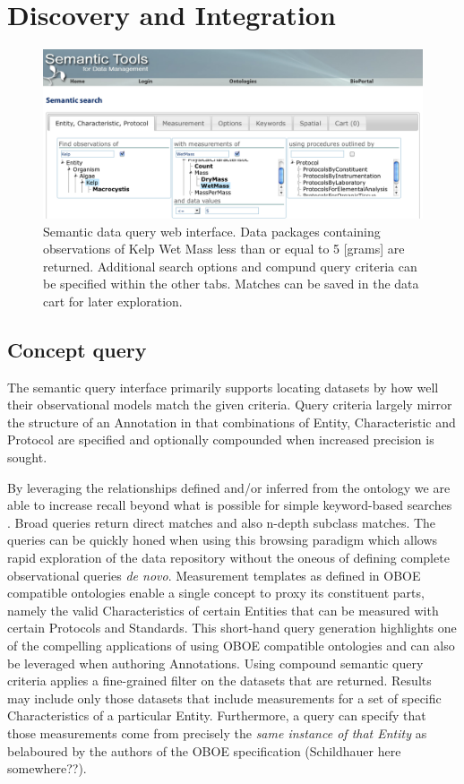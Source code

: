
\section{Discovery and Integration}
\label{sec:application}

\begin{figure}[!t]
\centering
\includegraphics[width=1.0\textwidth]{images/metacat-query.png}
\caption{Semantic data query web interface. Data packages containing observations of Kelp Wet Mass less than or equal to 5 [grams] are returned. Additional search options and compund query criteria can be specified within the other tabs. Matches can be saved in the data cart for later exploration.}
\label{fig:metacat-query}
\end{figure}

\subsection{Concept query}
The semantic query interface primarily supports locating datasets by how well their observational models match the given criteria. Query criteria largely mirror the structure of an Annotation in that combinations of Entity, Characteristic and Protocol are specified and optionally compounded when increased precision is sought. 

By leveraging the relationships defined and/or inferred from the
ontology we are able to increase recall beyond what is possible for
simple keyword-based searches
\cite{berkley09:_improv_data_discov_for_metad}. Broad queries return
direct matches and also n-depth subclass matches. The queries can be
quickly honed when using this browsing paradigm which allows rapid
exploration of the data repository without the oneous of defining
complete observational queries \emph{de novo}. Measurement templates
as defined in OBOE compatible ontologies enable a single concept to
proxy its constituent parts, namely the valid Characteristics of
certain Entities that can be measured with certain Protocols and
Standards. This short-hand query generation highlights one of the
compelling applications of using OBOE compatible ontologies and can
also be leveraged when authoring Annotations.  Using compound semantic
query criteria applies a fine-grained filter on the datasets that are
returned. Results may include only those datasets that include
measurements for a set of specific Characteristics of a particular
Entity. Furthermore, a query can specify that those measurements come
from precisely the \emph{same instance of that Entity} as belaboured
by the authors of the OBOE specification (Schildhauer here
somewhere??).

